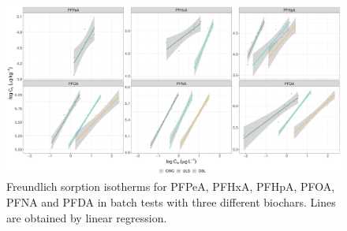 \begin{figure}[tb]
    \centering
    \includegraphics[width=\textwidth]{R/figs/Sorption_isotherms_single_BC.pdf}
    \caption{Freundlich sorption isotherms for PFPeA, PFHxA, PFHpA, PFOA, PFNA and PFDA in batch tests with three different biochars. Lines are obtained by linear regression.}
    \label{fig:sorption_isotherms}
\end{figure}

